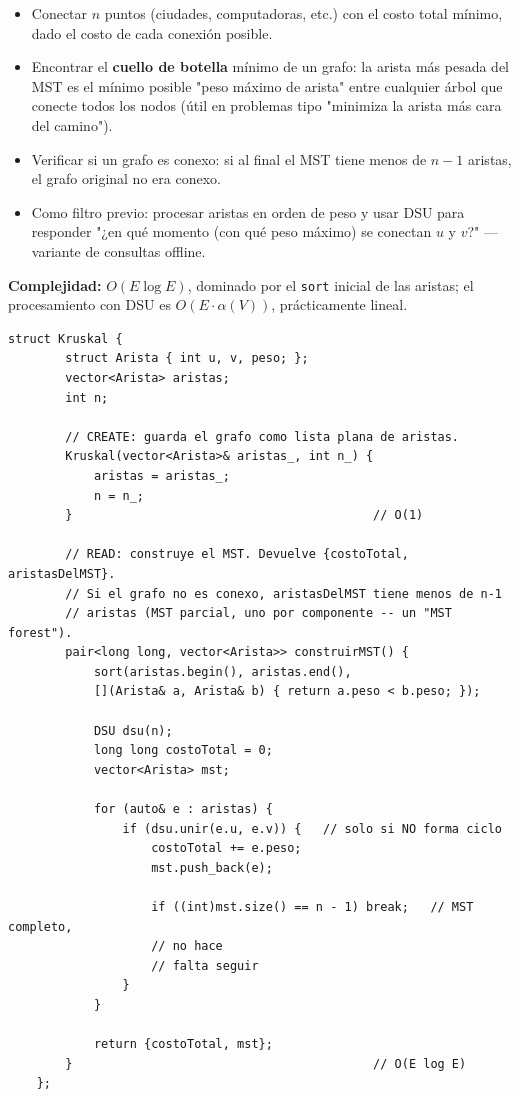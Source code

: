\documentclass[10pt,a4paper,twocolumn]{article}
\begin{document}
\begin{itemize}
	\item Conectar $n$ puntos (ciudades, computadoras, etc.) con el
	costo total mínimo, dado el costo de cada conexión posible.
	\item Encontrar el \textbf{cuello de botella} mínimo de un grafo:
	la arista más pesada del MST es el mínimo posible "peso máximo de
	arista" entre cualquier árbol que conecte todos los nodos (útil
	en problemas tipo "minimiza la arista más cara del camino").
	\item Verificar si un grafo es conexo: si al final el MST tiene
	menos de $n-1$ aristas, el grafo original no era conexo.
	\item Como filtro previo: procesar aristas en orden de peso y
	usar DSU para responder "¿en qué momento (con qué peso máximo) se
	conectan $u$ y $v$?" — variante de consultas offline.
\end{itemize}

\textbf{Complejidad:} $O(E \log E)$, dominado por el
\texttt{sort} inicial de las aristas; el procesamiento con DSU es
$O(E \cdot \alpha(V))$, prácticamente lineal.

\begin{lstlisting}[style=cpp]
	struct Kruskal {
		struct Arista { int u, v, peso; };
		vector<Arista> aristas;
		int n;
		
		// CREATE: guarda el grafo como lista plana de aristas.
		Kruskal(vector<Arista>& aristas_, int n_) {
			aristas = aristas_;
			n = n_;
		}                                          // O(1)
		
		// READ: construye el MST. Devuelve {costoTotal, aristasDelMST}.
		// Si el grafo no es conexo, aristasDelMST tiene menos de n-1
		// aristas (MST parcial, uno por componente -- un "MST forest").
		pair<long long, vector<Arista>> construirMST() {
			sort(aristas.begin(), aristas.end(),
			[](Arista& a, Arista& b) { return a.peso < b.peso; });
			
			DSU dsu(n);
			long long costoTotal = 0;
			vector<Arista> mst;
			
			for (auto& e : aristas) {
				if (dsu.unir(e.u, e.v)) {   // solo si NO forma ciclo
					costoTotal += e.peso;
					mst.push_back(e);
					
					if ((int)mst.size() == n - 1) break;   // MST completo,
					// no hace
					// falta seguir
				}
			}
			
			return {costoTotal, mst};
		}                                          // O(E log E)
	};
\end{lstlisting}
\end{document}
